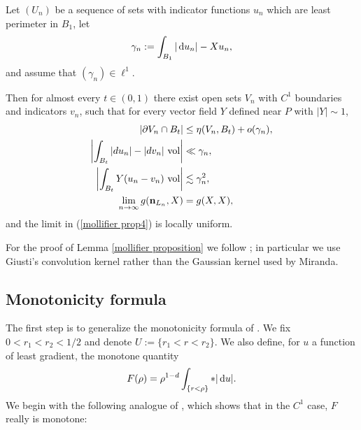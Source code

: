 \begin{lemma}\label{mollifier proposition}
Let $(U_n)$ be a sequence of sets with indicator functions $u_n$ which are least perimeter in $B_1$, let
$$\gamma_n := \int_{B_1} |\mathop{}\!\mathrm{d} u_n| - Xu_n,$$
and assume that $(\gamma_n) \in \ell^1$.

Then for almost every $t \in (0, 1)$ there exist open sets $V_n$ with $C^1$ boundaries and indicators $v_n$, such that for every vector field $Y$ defined near $P$ with $|Y| \sim 1$,
\begin{align}
|\partial V_n \cap B_t| &\leq \eta(V_n, B_t) + o(\gamma_n), \label{mollifier prop1}\\
\left|\int_{B_t} |du_n| - |dv_n| ~\mathrm{vol}\right| &\ll \gamma_n, \label{mollifier prop2}\\
\left|\int_{B_t} Y(u_n - v_n)~\mathrm{vol}\right| &\lesssim \gamma_n^2, \label{mollifier prop3}\\
\lim_{n \to \infty} g(\mathbf n_{L_n}, X) &= g(X, X), \label{mollifier prop4}
\end{align}
and the limit in (\ref{mollifier prop4}) is locally uniform.
\end{lemma}

For the proof of Lemma \ref{mollifier proposition} we follow \cite[Chapter 7]{Giusti77}; in particular we use Giusti's convolution kernel rather than the Gaussian kernel used by Miranda.


\subsection{Monotonicity formula}
The first step is to generalize the monotonicity formula of \cite[Teorema 3.3]{Miranda66}.
We fix $0 < r_1 < r_2 < 1/2$ and denote $U := \{r_1 < r < r_2\}$.
We also define, for $u$ a function of least gradient, the monotone quantity 
\begin{equation}\label{monotone quantity}
    F(\rho) = \rho^{1 - d} \int_{\{r < \rho\}} *|\mathop{}\!\mathrm{d} u|.
\end{equation}
We begin with the following analogue of \cite[pg68]{Giusti77}, which shows that in the $C^1$ case, $F$ really is monotone:

